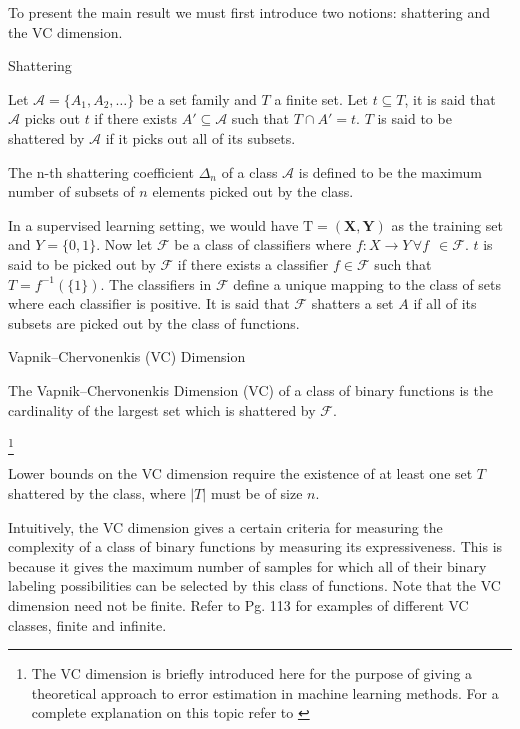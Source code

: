To present the main result we must first introduce two notions: shattering and the VC dimension.

\begin{definition}{Shattering}

Let $\mathcal {A}= \{A_1,A_{2},\dots \}$ be a set family and $T$ a finite set. Let $t \subseteq T$, it is said that $\mathcal {A}$ picks out $t$ if there exists $A' \subseteq \mathcal {A} $ such that $ T \cap A' = t$. $T$ is said to be shattered by $\mathcal {A}$ if it picks out all of its subsets.

\end{definition}
 
The n-th shattering coefficient $\Delta_n$ of a class $\mathcal {A}$ is defined to be the maximum number of subsets of $n$ elements picked out by the class. 

In a supervised learning setting, we would have $\mathrm{T} = (\textbf{X},\textbf{Y})$ as the training set and $Y = \{0,1 \}$. Now let $\mathcal {F}$ be a class of classifiers where $f: X \rightarrow Y \, \forall f \ \ \in \mathcal {F}$. $t$ is said to be picked out by $\mathcal {F}$ if there exists a classifier $f \in \mathcal {F}$ such that $T = f^{-1}(\{1\})$. The classifiers in $\mathcal {F}$ define a unique mapping to the class of sets where each classifier is positive. It is said that $\mathcal {F}$ shatters a set $A$ if all of its subsets are picked out by the class of functions.

\begin{definition}{Vapnik–Chervonenkis (VC) Dimension}
 	
The Vapnik–Chervonenkis Dimension (VC) of a class of binary functions is the cardinality of the largest set which is shattered by $\mathcal {F}$. 
\end{definition}\footnote{The VC dimension is briefly introduced here for the purpose of giving a theoretical approach to error estimation in machine learning methods. For a complete explanation on this topic refer to \cite{vapnik-nature2013}}

Lower bounds on the VC dimension require the existence of at least one set $T$ shattered by the class, where $|T|$ must be of size $n$.

Intuitively, the VC dimension gives a certain criteria for measuring the complexity of a class of binary functions by measuring its expressiveness. This is because it gives the maximum number of samples for which all of their binary labeling possibilities can be selected by this class of functions. 
Note that the VC dimension need not be finite. Refer to \cite{cherkassky-learning2007} Pg. 113 for examples of different VC classes, finite and infinite.

